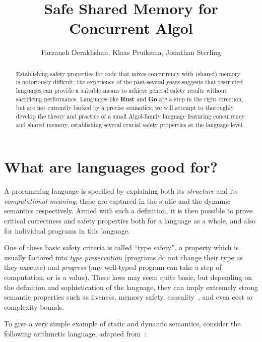 \documentclass{article}
\title{Safe Shared Memory for Concurrent Algol}
\author{Farzaneh Derakhshan, Klaas Pruiksma, Jonathan Sterling}
\newcommand\Lang[1]{{\sffamily\bfseries{#1}}}
\begin{document}
\maketitle

\begin{abstract}
  Establishing safety properties for code that mixes concurrency with
  (shared) memory is notoriously difficult; the experience of the past
  several years suggests that restricted languages can provide a
  suitable means to achieve general safety results without sacrificing
  performance. Languages like \Lang{Rust} and \Lang{Go} are a step in
  the right direction, but are not currently backed by a precise
  semantics; we will attempt to thoroughly develop the theory and
  practice of a small Algol-family language featuring concurrency and
  shared memory, establishing several crucial safety properties at the
  language level.
\end{abstract}

\section{What are languages good for?}

A proramming language is specified by explaining both its
\emph{structure} and its \emph{computational meaning}; these are
captured in the static and the dynamic semantics respectively. Armed
with such a definition, it is then possible to prove critical
correctness and safety properties both for a language as a whole, and
also for individual programs in this language.

One of these basic safety criteria is called ``type safety'', a
property which is usually factored into \emph{type preservation}
(programs do not change their type as they execute) and
\emph{progress} (any well-typed program can take a step of
computation, or is a value). These laws may seem quite basic, but
depending on the definition and sophistication of the language, they
can imply extremely strong semantic properties such as liveness,
memory safety, causality~\cite{atkey-mcbride:2013}, and even cost or
complexity bounds.

To give a very simple example of static and dynamic semantics,
consider the following arithmetic language, adapted
from~\cite{harper:2016}:

\newcommand\IsOk[1]{{#1}\ \mathsf{ok}}
\newcommand\IsVal[1]{{#1}\ \mathsf{val}}
\newcommand\Step[2]{{#1}\mapsto{#2}}
\newcommand\Plus[2]{\mathtt{plus} (#1, #2)}
\newcommand\Num[1]{\mathtt{num}[#1]}
\end{document}
